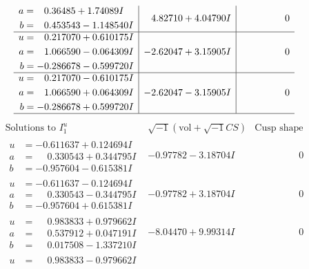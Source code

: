 \documentclass[1p]{elsarticle_modified}
\theoremstyle{definition}
\newcommand{\I}{\sqrt{-1}}
\begin{document}
$$\begin{array}{c|c|c}
\begin{aligned}
a &= \phantom{-}0.36485 + 1.74089 I \\
b &= \phantom{-}0.453543 - 1.148540 I\end{aligned}
 & \phantom{-}4.82710 + 4.04790 I & \phantom{-0.000000 } 0 \\ \hline\begin{aligned}
u &= \phantom{-}0.217070 + 0.610175 I \\
a &= \phantom{-}1.066590 - 0.064309 I \\
b &= -0.286678 - 0.599720 I\end{aligned}
 & -2.62047 + 3.15905 I & \phantom{-0.000000 } 0 \\ \hline\begin{aligned}
u &= \phantom{-}0.217070 - 0.610175 I \\
a &= \phantom{-}1.066590 + 0.064309 I \\
b &= -0.286678 + 0.599720 I\end{aligned}
 & -2.62047 - 3.15905 I & \phantom{-0.000000 } 0\\
 \hline 
 \end{array}$$\newpage$$\begin{array}{c|c|c}  
\text{Solutions to }I^u_{1}& \I (\text{vol} + \sqrt{-1}CS) & \text{Cusp shape}\\
 \hline 
\begin{aligned}
u &= -0.611637 + 0.124694 I \\
a &= \phantom{-}0.330543 + 0.344795 I \\
b &= -0.957604 - 0.615381 I\end{aligned}
 & -0.97782 - 3.18704 I & \phantom{-0.000000 } 0 \\ \hline\begin{aligned}
u &= -0.611637 - 0.124694 I \\
a &= \phantom{-}0.330543 - 0.344795 I \\
b &= -0.957604 + 0.615381 I\end{aligned}
 & -0.97782 + 3.18704 I & \phantom{-0.000000 } 0 \\ \hline\begin{aligned}
u &= \phantom{-}0.983833 + 0.979662 I \\
a &= \phantom{-}0.537912 + 0.047191 I \\
b &= \phantom{-}0.017508 - 1.337210 I\end{aligned}
 & -8.04470 + 9.99314 I & \phantom{-0.000000 } 0 \\ \hline\begin{aligned}
u &= \phantom{-}0.983833 - 0.979662 I \\

\end{aligned}
\end{array}$$
\end{document}

